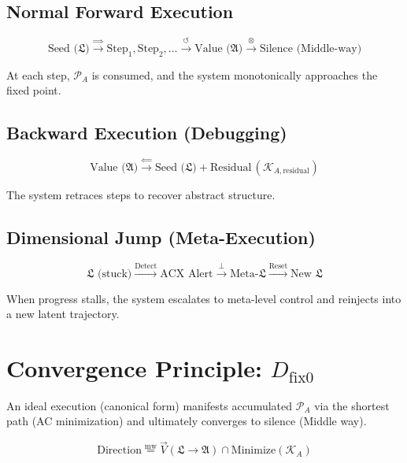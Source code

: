 \documentclass[12pt,a4paper]{article}
\theoremstyle{definition}
\newcommand{\aletheia}{\mathfrak{A}}
\newcommand{\letheia}{\mathfrak{L}}
\newcommand{\powa}{\mathcal{P}_A}
\newcommand{\mweq}{\mathrel{\overset{\mathrm{mw}}{=}}}
\newcommand{\dfix}{D_{\text{fix0}}}
\newcommand{\kal}{\mathcal{K}_A}
\begin{document}
\subsection{Normal Forward Execution}

\begin{equation}
\text{Seed ($\letheia$)} \xrightarrow{\Rightarrow} \text{Step}_1, \text{Step}_2, \ldots \xrightarrow{\circlearrowleft} \text{Value ($\aletheia$)} \xrightarrow{\otimes} \text{Silence (Middle-way)}
\end{equation}

At each step, $\powa$ is consumed, and the system monotonically approaches the fixed point.

\subsection{Backward Execution (Debugging)}

\begin{equation}
\text{Value ($\aletheia$)} \xrightarrow{\Leftarrow} \text{Seed ($\letheia$)} + \text{Residual} \, (\mathcal{K}_{A,\text{residual}})
\end{equation}

The system retraces steps to recover abstract structure.

\subsection{Dimensional Jump (Meta-Execution)}

\begin{equation}
\text{$\letheia$ (stuck)} \xrightarrow{\text{Detect}} \text{ACX Alert} \xrightarrow{\perp} \text{Meta-$\letheia$} \xrightarrow{\text{Reset}} \text{New $\letheia$}
\end{equation}

When progress stalls, the system escalates to meta-level control and reinjects into a new latent trajectory.

\section{Convergence Principle: $\dfix$}

An ideal execution (canonical form) manifests accumulated $\powa$ via the shortest path (AC minimization) and ultimately converges to silence (Middle way).

\begin{equation}
\text{Direction} \mweq \vec{V}(\letheia \to \aletheia) \cap \text{Minimize}(\kal)
\end{equation}
\end{document}

